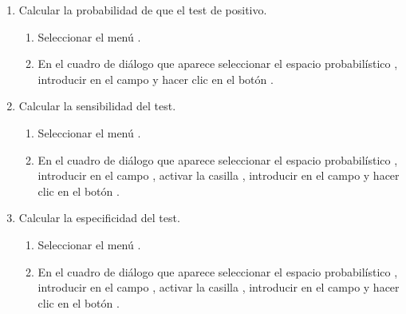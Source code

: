 \begin{enumerate}[leftmargin=*]
\begin{enumerate}
\item Calcular la probabilidad de que el test de positivo.
\begin{indicacion}
\begin{enumerate}
\item Seleccionar el menú .
\item En el cuadro de diálogo que aparece seleccionar el espacio probabilístico , introducir
 en el campo  y hacer clic en el botón .
\end{enumerate}
\end{indicacion} 

\item Calcular la sensibilidad del test.
\begin{indicacion}
\begin{enumerate}
\item Seleccionar el menú .
\item En el cuadro de diálogo que aparece seleccionar el espacio probabilístico , introducir
 en el campo , activar la casilla , introducir
 en el campo  y hacer clic en el botón .
\end{enumerate}
\end{indicacion} 

\item Calcular la especificidad del test.
\begin{indicacion}
\begin{enumerate}
\item Seleccionar el menú .
\item En el cuadro de diálogo que aparece seleccionar el espacio probabilístico , introducir
 en el campo , activar la casilla , introducir
 en el campo  y hacer clic en el botón .
\end{enumerate}
\end{indicacion} 


\end{enumerate}
\end{enumerate}
